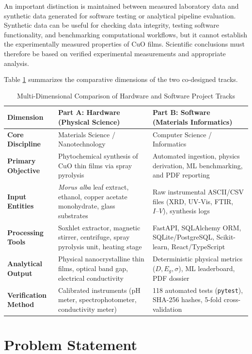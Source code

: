 \documentclass[12pt,a4paper,oneside]{report}
\begin{document}
{{{An important distinction is maintained between measured laboratory data and synthetic data generated for software testing or analytical pipeline evaluation. Synthetic data can be useful for checking data integrity, testing software functionality, and benchmarking computational workflows, but it cannot establish the experimentally measured properties of $\text{CuO}$ films. Scientific conclusions must therefore be based on verified experimental measurements and appropriate analysis.

Table \ref{tab:track_comparison} summarizes the comparative dimensions of the two co-designed tracks.

\begin{table}[h!]
\centering
\caption{Multi-Dimensional Comparison of Hardware and Software Project Tracks}
\label{tab:track_comparison}
\begin{tabular}{|p{3.2cm}|p{6.0cm}|p{6.0cm}|}
\hline
\textbf{Dimension} & \textbf{Part A: Hardware (Physical Science)} & \textbf{Part B: Software (Materials Informatics)} \\
\hline
\textbf{Core Discipline} & Materials Science / Nanotechnology & Computer Science / Informatics \\
\hline
\textbf{Primary Objective} & Phytochemical synthesis of $\text{CuO}$ thin films via spray pyrolysis & Automated ingestion, physics derivation, ML benchmarking, and PDF reporting \\
\hline
\textbf{Input Entities} & \textit{Morus alba} leaf extract, ethanol, copper acetate monohydrate, glass substrates & Raw instrumental ASCII/CSV files (XRD, UV-Vis, FTIR, $I\text{--}V$), synthesis logs \\
\hline
\textbf{Processing Tools} & Soxhlet extractor, magnetic stirrer, centrifuge, spray pyrolysis unit, heating stage & FastAPI, SQLAlchemy ORM, SQLite/PostgreSQL, Scikit-learn, React/TypeScript \\
\hline
\textbf{Analytical Output} & Physical nanocrystalline thin films, optical band gap, electrical conductivity & Deterministic physical metrics ($D, E_g, \sigma$), ML leaderboard, PDF dossier \\
\hline
\textbf{Verification Method} & Calibrated instruments (pH meter, spectrophotometer, conductivity meter) & 118 automated tests (\texttt{pytest}), SHA-256 hashes, 5-fold cross-validation \\
\hline
\end{tabular}
\end{table}

\section{Problem Statement}

}}}
\end{document}
